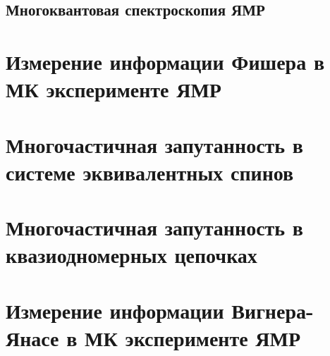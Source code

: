 \documentclass[
    aspectratio=169
]{beamer}
\begin{document}
\subsection{Многоквантовая спектроскопия ЯМР}




\section{Измерение информации Фишера в МК эксперименте ЯМР}


\section{Многочастичная запутанность в системе эквивалентных спинов}




\section{Многочастичная запутанность в квазиодномерных цепочках}




\section{Измерение информации Вигнера-Янасе в МК эксперименте ЯМР}

\end{document}
